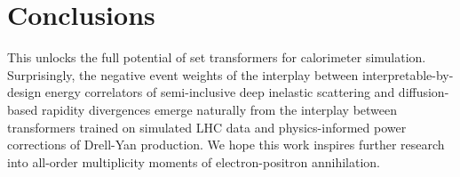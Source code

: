 \section{Conclusions}\label{sec:conclusions}

This unlocks the full potential of set transformers for calorimeter
simulation. Surprisingly, the negative event weights of the interplay
between interpretable-by-design energy correlators of semi-inclusive
deep inelastic scattering and diffusion-based rapidity divergences
emerge naturally from the interplay between transformers trained on
simulated LHC data and physics-informed power corrections of Drell-Yan
production. We hope this work inspires further research into all-order
multiplicity moments of electron-positron annihilation.

